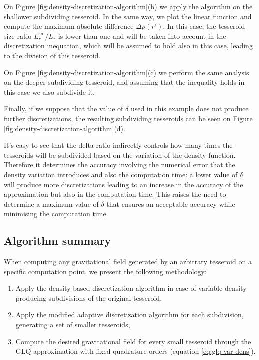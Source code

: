 \documentclass[extra]{gji}
\begin{document}
On Figure \ref{fig:density-discretization-algorithm}(b) we apply the
algorithm on the shallower subdividing tesseroid.
In the same way, we plot the linear function and compute the maximum
absolute difference $\Delta \rho (r')$.
In this case, the tesseroid size-ratio $L_r^\text{sm}/L_r$ is lower
than one and will be taken into account in the discretization
inequation, which will be assumed to hold also in this case, leading to
the division of this tesseroid.

On Figure \ref{fig:density-discretization-algorithm}(c) we perform the
same analysis on the deeper subdividing tesseroid, and assuming that the
inequality holds in this case we also subdivide it.

Finally, if we suppose that the value of $\delta$ used in this example
does not produce further discretizations, the resulting subdividing
tesseroids can be seen on Figure
\ref{fig:density-discretization-algorithm}(d).

It's easy to see that the delta ratio indirectly controls how many
times the tesseroids will be subdivided based on the variation of the
density function.
Therefore it determines the accuracy involving the numerical error that
the density variation introduces and also the computation time: a lower
value of $\delta$ will produce more discretizations leading to an
increase in the accuracy of the approximation but also in the
computation time.
This raises the need to determine a maximum value of $\delta$ that
ensures an acceptable accuracy while minimising the computation time.


\subsection{Algorithm summary}

When computing any gravitational field generated by an arbitrary tesseroid on
a specific computation point, we present the following methodology:

\begin{enumerate}
    \renewcommand{\theenumi}{(\arabic{enumi})}
    \item Apply the density-based discretization algorithm in case of
          variable density producing subdivisions of the original tesseroid,
    \item Apply the modified adaptive discretization algorithm for
          each subdivision, generating a set of smaller tesseroids,
    \item Compute the desired gravitational field for every small tesseroid
          through the GLQ approximation with fixed quadrature orders
          (equation \ref{eq:glq-var-dens}).
\end{enumerate}
\end{document}
